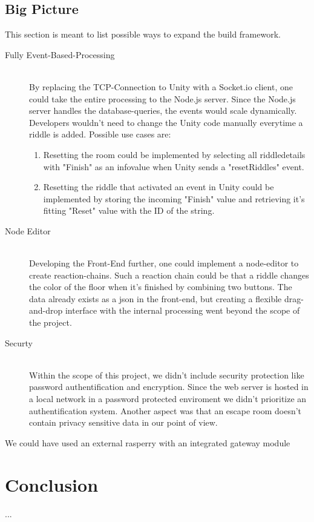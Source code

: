 \subsection{Big Picture}
This section is meant to list possible ways to expand the build framework.
\begin{description}
    \item [Fully Event-Based-Processing]\hfill \\ 
    By replacing the TCP-Connection to Unity with a Socket.io client, 
    one could take the entire processing to the Node.js server. Since the Node.js server handles the database-queries,
    the events would scale dynamically. Developers wouldn't need to change the Unity code manually everytime a riddle is added. 
    Possible use cases are:
    \begin{enumerate}
        \item Resetting the room could be implemented by selecting all riddledetails with "Finish" as an infovalue when Unity sends a "resetRiddles" event.
        \item 
        Resetting the riddle that activated an event in Unity could be implemented by storing the incoming "Finish" 
        value and retrieving it's fitting "Reset" value with the ID of the string.
    \end{enumerate}
    \item [Node Editor]\hfill \\
    Developing the Front-End further, one could implement a node-editor to create reaction-chains. 
    Such a reaction chain could be that a riddle changes the color of the floor when it's finished by combining two buttons. 
    The data already exists as a json in the front-end, but creating a flexible drag-and-drop interface with the internal processing 
    went beyond the scope of the project. 
    \item [Securty] \hfill \\
    Within the scope of this project, we didn't include security protection like password authentification and encryption.
    Since the web server is hosted in a local network in a password protected enviroment we didn't prioritize an authentification system.
    Another aspect was that an escape room doesn't contain privacy sensitive data in our point of view.
\end{description}
We could have used an external rasperry with an integrated gateway module
\section{Conclusion}
...



